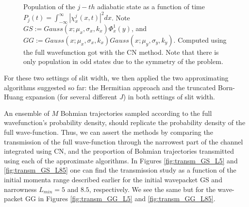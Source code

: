 \documentclass[11pt, a4paper]{article} %
\begin{document}
\begin{figure}[h!]
  \caption{ Population of the $j-th$ adiabatic state as a function of time $P_j(t)=\int_{-\infty}^\infty |\chi^j_x(x,t)|^2dx $. Note $GS:=Gauss(x;\mu_x, \sigma_x, k_x)\Phi^1_x(y)$, and $GG:=Gauss(x;\mu_x, \sigma_x, k_x)Gauss(x;\mu_y, \sigma_y, k_y)$. Computed using the full wavefunction got with the CN method. Note that there is only population in odd states due to the symmetry of the problem.}
  \label{fig:popsInTime}
\end{figure}
\newpage

For these two settings of slit width, we then applied the two approximating algorithms suggested so far: the Hermitian approach and the truncated Born-Huang expansion (for several different $J$) in both settings of slit width. 

An ensemble of $M$ Bohmian trajectories sampled according to the full wavefunction's probability density, should replicate the probability density of the full wave-function. Thus, we can assert the methods by comparing the transmission of the full wave-function through the narrowest part of the channel integrated using CN, and the proportion of Bohmian trajectories transmitted using each of the approximate algorithms. In Figures \ref{fig:transm_GS_L5} and \ref{fig:transm_GS_L85} one can find the transmission study as a function of the initial momenta range described earlier for the initial wavepacket GS and narrowness $L_{min}=5$ and $8.5$, respectively. We see the same but for the wave-packet GG in Figures \ref{fig:transm_GG_L5} and \ref{fig:transm_GG_L85}.
\end{document}

